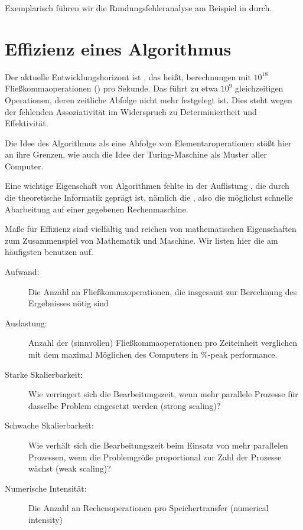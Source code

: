 \begin{example}
  Exemplarisch führen wir die Rundungsfehleranalyse am Beispiel in
  \cite[Lemma 2.30]{DeuflhardHohmann08} durch.
\end{example}

\section{Effizienz eines Algorithmus}

\begin{remark}
  Der aktuelle Entwicklungshorizont ist ,
  das heißt, berechnungen mit $10^{18}$ Fließkommaoperationen
  () pro Sekunde. Das führt zu etwa $10^9$ gleichzeitigen
  Operationen, deren zeitliche Abfolge nicht mehr festgelegt ist. Dies
  steht wegen der fehlenden Assoziativität im Widerspruch zu
  Determiniertheit und Effektivität.

  Die Idee des Algorithmus als eine \glqq Abfolge von
  Elementaroperationen\grqq{} stößt hier an ihre Grenzen, wie auch die
  Idee der Turing-Maschine als Muster aller Computer.
\end{remark}

\begin{remark}
  Eine wichtige Eigenschaft von Algorithmen fehlte in der Auflistung
  , die durch die
  theoretische Informatik geprägt ist, nämlich die ,
  also die möglichst schnelle Abarbeitung auf einer gegebenen
  Rechenmaschine.

  Maße für Effizienz sind vielfältig und reichen von mathematischen
  Eigenschaften zum Zusammenspiel von Mathematik und Maschine. Wir
  listen hier die am häufigsten benutzen auf.

  \begin{description}
  \item[Aufwand:] Die Anzahl an Fließkommaoperationen, die insgesamt
    zur Berechnung des Ergebnisses nötig sind
  \item[Auslastung:] Anzahl der (sinnvollen) Fließkommaoperationen pro
    Zeiteinheit verglichen mit dem maximal Möglichen des Computers in
    \glqq\%-peak performance\grqq.
  \item[Starke Skalierbarkeit:] Wie verringert sich die
    Bearbeitungszeit, wenn mehr parallele Prozesse für dasselbe
    Problem eingesetzt werden (strong scaling)?
  \item[Schwache Skalierbarkeit:] Wie verhält sich die
    Bearbeitungszeit beim Einsatz von mehr parallelen Prozessen, wenn
    die Problemgröße proportional zur Zahl der Prozesse wächst (weak scaling)?
  \item[Numerische Intensität:] Die Anzahl an Rechenoperationen pro
    Speichertransfer (numerical intensity)
  \end{description}
\end{remark}

